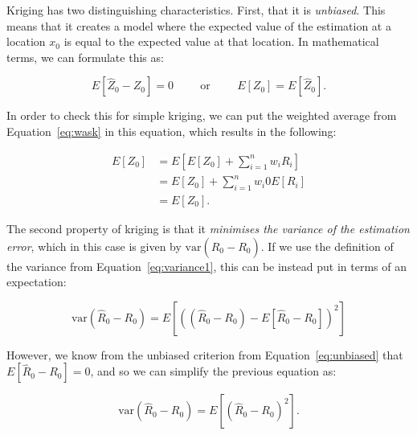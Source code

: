 Kriging has two distinguishing characteristics.
First, that it is \emph{unbiased}.
This means that it creates a model where the expected value of the estimation at a location \(x_0\) is equal to the expected value at that location.
In mathematical terms, we can formulate this as:

\begin{equation}
\label{eq:unbiased}
E\left[ \hat{Z}_0 - Z_0 \right] = 0 \hspace{1cm}\text{or}\hspace{1cm}E\left[Z_0\right] = E\left[ \hat{Z}_0 \right].
\end{equation}

In order to check this for simple kriging, we can put the weighted average from Equation~\ref{eq:wask} in this equation, which results in the following:

\begin{align}
  E\left[ Z_0 \right] &= E\left[ E[Z_0] + \sum_{i=1}^n w_i R_i \right] \nonumber \\
  &= E[Z_0] + \sum_{i=1}^n w_i 0{E[R_i]} \nonumber \\
  &= E[Z_0].  \nonumber
\end{align}

The second property of kriging is that it \emph{minimises the variance of the estimation error}, which in this case is given by \(\mathrm{var}\left(\hat{R}_0 - R_0\right)\).
If we use the definition of the variance from Equation~\ref{eq:variance1}, this can be instead put in terms of an expectation:

\begin{equation}
\mathrm{var}\left(\hat{R}_0 - R_0\right) = E \left[ \left( \left(\hat{R}_0 - R_0\right) - E \left[\hat{R}_0 - R_0\right] \right)^2 \right] \nonumber
\end{equation}

However, we know from the unbiased criterion from Equation~\ref{eq:unbiased} that \(E\left[ \hat{R}_0 - R_0 \right] = 0\), and so we can simplify the previous equation as:

\begin{equation}
\mathrm{var}\left(\hat{R}_0 - R_0\right) = E\left[\left( \hat{R}_0 - R_0 \right)^2\right] \nonumber.
\end{equation}

